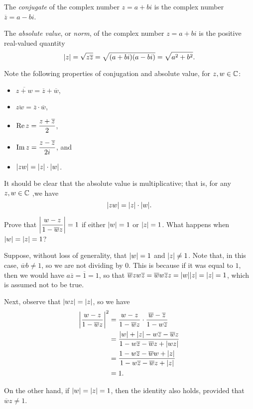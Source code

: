\begin{definition}
	The \textit{conjugate} of the complex number $z=a+bi$ is the complex number $\overline{z}=a-bi$. 
\end{definition}

\begin{definition}
	The \emph{absolute value}, or \emph{norm}, of the complex number $z=a+bi$ is the positive real-valued quantity $$\lvert z \rvert=\sqrt{z\overline{z}}=\sqrt{(a+bi)(a-bi)}=\sqrt{a^2+b^2}.$$
\end{definition}

Note the following properties of conjugation and absolute value, for $z,w \in \mathbb C$:
\begin{itemize}
	\item $\overline{z+w}=\overline{z}+\overline{w}$,
	\item $\overline{zw}=\overline{z} \cdot \overline{w}$,
	\item $\operatorname{Re} z=\dfrac{z+\overline{z}}{2}$,
	\item $\operatorname{Im} z=\dfrac{z-\overline{z}}{2i}$, and
	\item $\lvert zw \rvert=\lvert z \rvert \cdot \lvert w \rvert$.
\end{itemize}

It should be clear that the absolute value is multiplicative; that is, for any $z,w \in \mathbb C$ ,we have $$\lvert zw \rvert=\lvert z \rvert \cdot \lvert w \rvert.$$

\begin{exercise}
	Prove that $\left\lvert \dfrac{w-z}{1-\overline{w}z}\right \rvert=1$ if either $\lvert w \rvert=1$ or $\lvert z \rvert=1$. What happens when $\lvert w \rvert=\lvert z \rvert=1$?
	
	\begin{sol}
		Suppose, without loss of generality, that $\lvert w \rvert=1$ and $\lvert z \rvert \neq 1$. Note that, in this case, $\overline{w}b \neq 1$, so we are not dividing by $0$. This is because if it was equal to $1$, then we would have $a\overline{z}=\overline{1}=1$, so that $\overline{w}zw\overline{z}=\overline{w}w\overline{z}z=\lvert w \rvert\lvert z \rvert=\lvert z \rvert=1$, which is assumed not to be true.
		
		Next, observe that $\lvert wz \rvert=\lvert z \rvert$, so we have
		\begin{align*}
			\left\lvert \dfrac{w-z}{1-\overline{w}z}\right \rvert^2 &=\dfrac{w-z}{1-\overline{w}z} \cdot \dfrac{\overline{w}-\overline{z}}{1-w\overline{z}} \\
			&=\dfrac{\lvert w \rvert+\lvert z \rvert-w\overline{z}-\overline{w}z}{1-w\overline{z}-\overline{w}z+\lvert wz \rvert} \\
			&=\dfrac{1-w\overline{z}-\overline{w}w+\lvert z \rvert}{1-w\overline{z}-\overline{w}z+\lvert z \rvert} \\
			&=1.
		\end{align*}
		
		On the other hand, if $\lvert w \rvert=\lvert z \rvert=1$, then the identity also holds, provided that $\overline{w}z \neq 1$.
	\end{sol}
\end{exercise}

